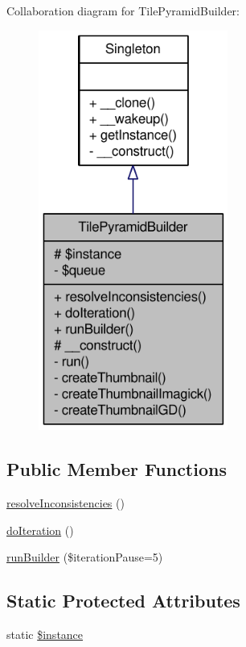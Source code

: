 Collaboration diagram for TilePyramidBuilder:\nopagebreak
\begin{figure}[H]
\begin{center}
\leavevmode
\includegraphics[width=176pt]{classTilePyramidBuilder__coll__graph}
\end{center}
\end{figure}
\subsection*{Public Member Functions}
\begin{DoxyCompactItemize}
\item 
\hyperlink{classTilePyramidBuilder_ab0b4e43e682c9e3577d43f3af26838f7}{resolveInconsistencies} ()
\item 
\hyperlink{classTilePyramidBuilder_a694bcf5f6a6c8d15326d68408155e9cd}{doIteration} ()
\item 
\hyperlink{classTilePyramidBuilder_a2daaa252ca14e474fbf92466c98abf46}{runBuilder} (\$iterationPause=5)
\end{DoxyCompactItemize}
\subsection*{Static Protected Attributes}
\begin{DoxyCompactItemize}
\item 
static \hyperlink{classTilePyramidBuilder_ae07c9ce1d0788ab44fc9ff0f3a18442e}{\$instance}
\end{DoxyCompactItemize}


